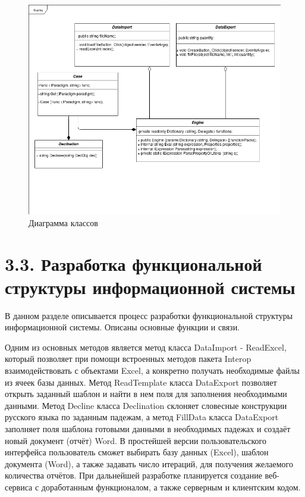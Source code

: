 \begin{figure}
	\caption{Диаграмма классов}
	\centering
	\includegraphics[width=\textwidth]{./UIR Class.png}
\end{figure}

\section{3.3. Разработка функциональной структуры информационной системы}

В данном разделе описывается процесс разработки функциональной структуры информационной системы. Описаны основные функции и связи.


Одним из основных методов является метод класса DataImport - ReadExcel, который позволяет при помощи встроенных методов пакета Interop взаимодействовать с объектами Excel, а конкретно получать необходимые файлы из ячеек базы данных. 
Метод ReadTemplate класса DataExport позволяет открыть заданный шаблон и найти в нем поля для заполнения необходимыми данными.
Метод Decline класса Declination склоняет словесные конструкции русского языка по заданным падежам, а метод FillData класса DataExport заполняет поля шаблона готовыми данными в необходимых падежах и создаёт новый документ (отчёт) Word. В простейшей версии пользовательского интерфейса пользователь сможет выбирать базу данных (Excel), шаблон документа (Word), а также задавать число итераций, для получения желаемого количества отчётов. При дальнейшей разработке планируется создание веб-сервиса с доработанным функционалом, а также серверным и клиентским кодом.
\cite{mcrsft}

